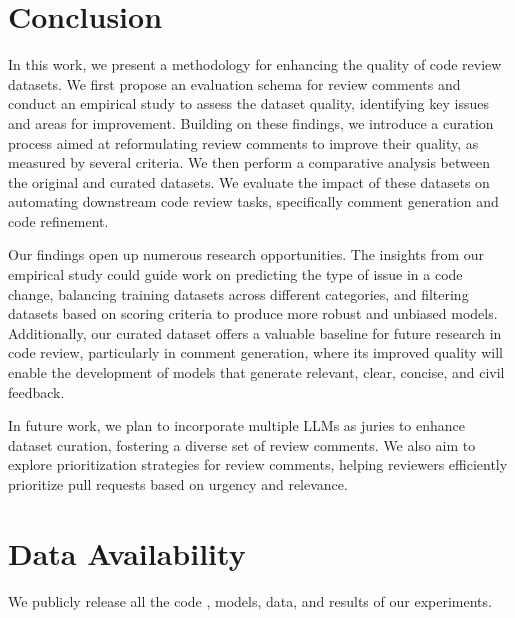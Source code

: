 \section{Conclusion}
\label{sec:conclusion}

In this work, we present a methodology for enhancing the quality of code review datasets. We first propose an evaluation schema for review comments and conduct an empirical study to assess the dataset quality, identifying key issues and areas for improvement. Building on these findings, we introduce a curation process aimed at reformulating review comments to improve their quality, as measured by several criteria. We then perform a comparative analysis between the original and curated datasets. We evaluate the impact of these datasets on automating downstream code review tasks, specifically comment generation and code refinement.

Our findings open up numerous research opportunities. The insights from our empirical study could guide work on predicting the type of issue in a code change, balancing training datasets across different categories, and filtering datasets based on scoring criteria to produce more robust and unbiased models. Additionally, our curated dataset offers a valuable baseline for future research in code review, particularly in comment generation, where its improved quality will enable the development of models that generate relevant, clear, concise, and civil feedback.

In future work, we plan to incorporate multiple LLMs as juries to enhance dataset curation, fostering a diverse set of review comments. We also aim to explore prioritization strategies for review comments, helping reviewers efficiently prioritize pull requests based on urgency and relevance.


\section*{Data Availability}
We publicly release all the code \cite{github_replication}, models, data, and results \cite{zenodo_data} of our experiments.